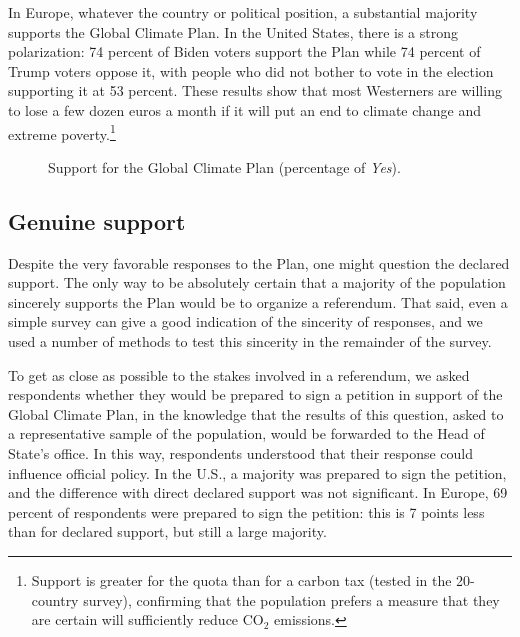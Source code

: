 \documentclass[a5paper,english,openany]{memoir}
\begin{document}
In Europe, whatever the country or political position, a substantial %
majority supports the Global Climate Plan. 
In the United States, there is a strong polarization: 74 percent of Biden voters support the Plan while 74 percent of Trump voters oppose it, with people who did not bother to vote in the election %
supporting it at 53 percent.  
These results show that most Westerners are willing to lose a few dozen euros a month if it will put an end to climate change and extreme poverty.\footnote{Support is greater for the quota than for a carbon tax (tested in the 20-country survey), confirming that the population prefers a measure that they are certain will sufficiently reduce CO$_\text{2}$ emissions.}

\begin{figure}[h!]
  \caption[Support for the Global Climate Plan]{Support for the Global Climate Plan (percentage of \textit{Yes}).} 
  \label{fig:gcs_support} 
\end{figure}

\subsection*{Genuine support} %

Despite the very favorable %
responses to the Plan, one might question the declared support. 
The only way to be absolutely certain that a majority of the population sincerely supports the Plan would be to organize %
a referendum. That said, even a simple survey can give a good indication of the sincerity of responses, and we used a number of methods to test this sincerity in the remainder of the survey. %

To get as close as possible to the stakes involved in a referendum, we asked respondents whether they would be prepared to sign a petition in support of the Global Climate Plan, in the knowledge that the results of this question, asked to a representative sample of the population, %
would be forwarded to the Head of State's office. In this way, respondents understood that their response could influence official policy. In the U.S., a majority was %
prepared to sign the petition, and the difference with direct declared support was %
not significant. In Europe, 69 percent of respondents were %
prepared to sign the petition: this is 7 points less than for declared support, but still a large majority. 
\end{document}
